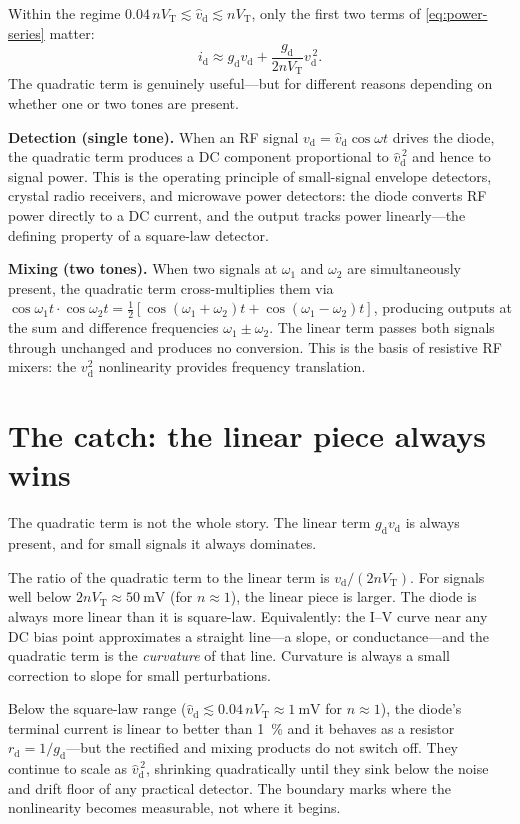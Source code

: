 \documentclass[12pt]{article}
\newcommand{\VT}{V_{\mathrm{T}}}
\newcommand{\vd}{v_{\mathrm{d}}}
\newcommand{\id}{i_{\mathrm{d}}}
\newcommand{\gd}{g_{\mathrm{d}}}
\newcommand{\rd}{r_{\mathrm{d}}}
\newcommand{\vhd}{\hat{v}_{\mathrm{d}}}
\begin{document}
Within the regime $0.04\,n\VT \lesssim \vhd \lesssim n\VT$, only the first two terms of \eqref{eq:power-series} matter:
\begin{equation}
  \id \approx \gd \vd + \frac{\gd}{2 n \VT} \vd^{\,2}.
  \label{eq:quadratic}
\end{equation}
The quadratic term is genuinely useful---but for different reasons depending on whether one or two tones are present.

\textbf{Detection (single tone).}
When an RF signal $\vd = \vhd \cos\omega t$ drives the diode, the quadratic term produces a DC component proportional to $\vhd^{\,2}$ and hence to signal power.
This is the operating principle of small-signal envelope detectors, crystal radio receivers, and microwave power detectors: the diode converts RF power directly to a DC current, and the output tracks power linearly---the defining property of a square-law detector.

\textbf{Mixing (two tones).}
When two signals at $\omega_1$ and $\omega_2$ are simultaneously present, the quadratic term cross-multiplies them via $\cos\omega_1 t\cdot\cos\omega_2 t = \tfrac{1}{2}[\cos(\omega_1+\omega_2)t + \cos(\omega_1-\omega_2)t]$, producing outputs at the sum and difference frequencies $\omega_1 \pm \omega_2$.
The linear term passes both signals through unchanged and produces no conversion.
This is the basis of resistive RF mixers: the $\vd^2$ nonlinearity provides frequency translation.

\section*{The catch: the linear piece always wins}

The quadratic term is not the whole story. The linear term $\gd \vd$ is always present, and for small signals it always dominates.

The ratio of the quadratic term to the linear term is $\vd/(2n\VT)$. For signals well below $2n\VT \approx \SI{50}{\milli\volt}$ (for $n \approx 1$), the linear piece is larger. The diode is always more linear than it is square-law. Equivalently: the I--V curve near any DC bias point approximates a straight line---a slope, or conductance---and the quadratic term is the \emph{curvature} of that line. Curvature is always a small correction to slope for small perturbations.

Below the square-law range ($\vhd \lesssim 0.04\,n\VT \approx \SI{1}{\milli\volt}$ for $n \approx 1$), the diode's terminal current is linear to better than \SI{1}{\percent} and it behaves as a resistor $\rd = 1/\gd$---but the rectified and mixing products do not switch off. They continue to scale as $\vhd^{\,2}$, shrinking quadratically until they sink below the noise and drift floor of any practical detector. The boundary marks where the nonlinearity becomes measurable, not where it begins.
\end{document}
